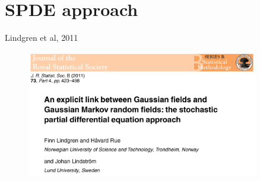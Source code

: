 \documentclass{beamer}
\begin{document}
%
%
\section{SPDE approach}

\begin{frame}{Lindgren et al, 2011} 
  \begin{figure}[h]
    \begin{center}
      \includegraphics[width=0.9\textwidth]{figures/lindgren.png}
    \end{center}
  \end{figure}
\end{frame}

%
%
%
\end{document}
